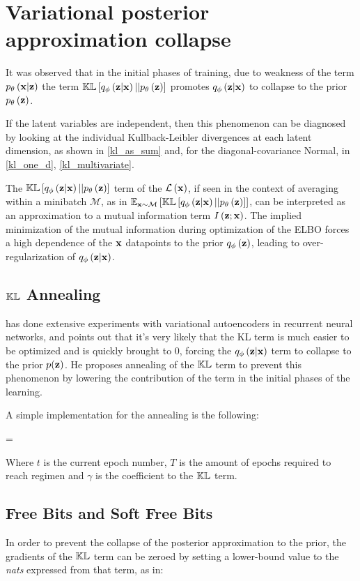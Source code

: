 \section{Variational posterior approximation collapse}
\label{posterior_collapse}

It was observed\cite{Kingma2017}\cite{1611.02731} that in the initial phases of training, due to weakness of the term $p_\theta\left(\mathbf{x}|\mathbf{z}\right)$ the term $\mathbb{KL}\left[ q_\phi\left(\mathbf{z}|\mathbf{x}\right) || p_\theta\left(\mathbf{z}\right) \right]$ 
promotes $q_\phi\left(\mathbf{z}|\mathbf{x}\right)$ to collapse to the prior $p_\theta\left(\mathbf{z}\right)$.

If the latent variables are independent, then this phenomenon can be diagnosed by looking at the individual Kullback-Leibler divergences
at each latent dimension, as shown in \ref{kl_as_sum} and, for the diagonal-covariance Normal, in \ref{kl_one_d}, \ref{kl_multivariate}.

 The $\mathbb{KL}\left[ q_\phi\left(\mathbf{z}|\mathbf{x}\right) || p_\theta\left(\mathbf{z}\right) \right]$ term of the $\mathcal{L}\left(\mathbf{x}\right)$, if seen in the context of averaging within a minibatch $\mathcal{M}$, as in
 $\mathbb{E}_{\mathbf{x}\sim\mathcal{M}}\left[ \mathbb{KL}\left[ q_\phi\left(\mathbf{z}|\mathbf{x}\right) || p_\theta\left(\mathbf{z}\right) \right] \right]$,
 can be interpreted as an approximation to a mutual information term $I\left( \mathbf{z} ; \mathbf{x} \right)$.
 The implied minimization of the mutual information during optimization of the ELBO forces a high dependence of the $\mathbf{x}$ datapoints to the prior $q_\phi\left(\mathbf{z}\right)$,
 leading to over-regularization of $q_\phi\left(\mathbf{z}|\mathbf{x}\right)$.

\subsection{$\mathbb{KL}$ Annealing}

\cite{Bowman} has done extensive experiments with variational autoencoders
in recurrent neural networks, and points out that it's very likely
that the KL term is much easier to be optimized
and is quickly brought to 0, forcing the $q_\phi\left(\mathbf{z}|\mathbf{x}\right)$ term to
collapse to the prior $p(\mathbf{z})$.
He proposes annealing of the $\mathbb{KL}$ term to prevent this phenomenon by
lowering the contribution of the term in the initial phases of the learning.

A simple implementation for the annealing is the following:
\begin{nalign}
\gamma = 
\end{nalign}

Where $t$ is the current epoch number, $T$ is the amount of epochs required to
reach regimen and $\gamma$ is the coefficient to the $\mathbb{KL}$ term.

\subsection{Free Bits and Soft Free Bits}
 In order to prevent the collapse of the posterior approximation to the prior, the gradients of the $\mathbb{KL}$ term can be zeroed by setting a lower-bound
 value to the \emph{nats} expressed from that term, as in:
\begin{nalign}
     \max\left[\lambda,\expectxM{\kl{\qzcond}{\pzonly}}\right]
\end{nalign}

